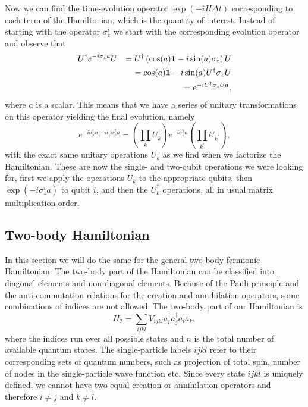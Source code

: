 \documentclass[aps,pra,twocolumn,floatfix]{revtex4}
\begin{document}
Now we can find  
the time-evolution operator $\exp(-iH\Delta t)$ corresponding to each
term of the Hamiltonian, which is the quantity of interest. 
Instead of starting
with the operator $\sigma_z^i$ we start with the corresponding
evolution operator and observe that
\begin{eqnarray}
U^\dag e^{-i\sigma_z a} U &&= U^\dag \left( \cos(a){\bf 1}
-i\sin(a) \sigma_z \right) U\notag \\
&&=\cos(a){\bf 1} -i \sin(a) U^\dag \sigma_zU \notag \\
&&=e^{-i U^\dag\sigma_zU a},
\end{eqnarray}
where $a$ is  a scalar.
This means that we have a series of unitary transformations on this
operator yielding the final evolution,  namely
\begin{equation}
\label{eq:Us}
e^{-i \sigma_x^i \sigma_z \cdots \sigma_z \sigma_x^j a} 
= \left(\prod_k U_k^\dag \right) e^{-i\sigma_z^ia} 
\left(\prod_{k^\prime}
U_{k^\prime}\right),
\end{equation}
with the exact same unitary operations $U_k$ as we find when we
factorize the Hamiltonian. These are now the single- and two-qubit operations we
were looking for, first we apply the operations $U_k$ to the
appropriate qubits, then $\exp(-i\sigma_z^ia)$ to qubit $i$, and then
the $U_k^\dag$ operations, all in usual matrix multiplication order.



\subsection{Two-body Hamiltonian}
\label{sec:2bH}
In this section we will do the same for the general two-body fermionic
Hamiltonian.
The two-body part of the Hamiltonian can be classified into
diagonal elements and non-diagonal elements. Because of the Pauli
principle and the anti-commutation relations for the creation and
annihilation operators, some combinations of indices are not allowed.
The two-body part of our Hamiltonian is 
\begin{equation}
H_2 = \sum_{ijkl} V_{ijkl} a_i^\dag a_j^\dag a_l a_k,
\end{equation} 
where the indices run over all possible states and $n$  is the total number
of available quantum states. 
The single-particle labels $ijkl$ refer to their 
corresponding sets of quantum numbers, such as 
projection of total spin, number of nodes in the single-particle wave function etc. Since every state
$ijkl$ is uniquely defined,
we cannot have two equal
creation or annihilation operators and therefore $i\neq j$ and $k\neq
l$.
\end{document}
